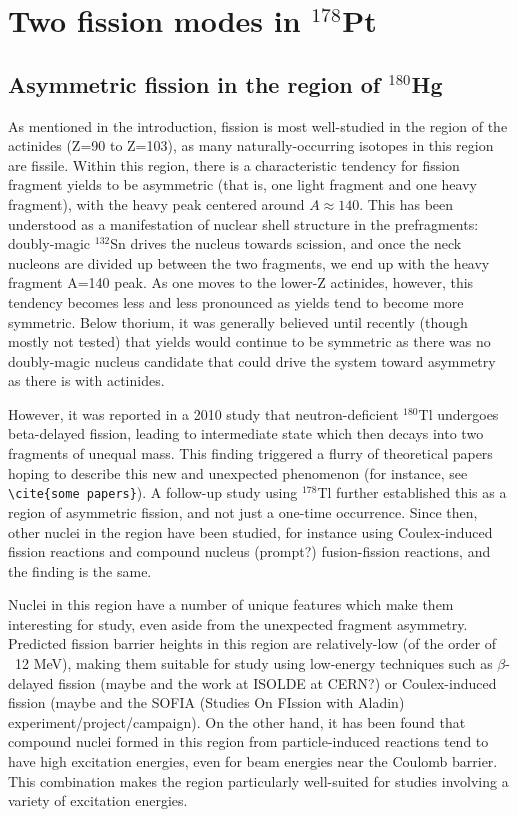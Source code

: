 \chapter{Two fission modes in $^{178}$Pt}\label{chap:178Pt}

\section{Asymmetric fission in the region of $^{180}$Hg}
As mentioned in the introduction, fission is most well-studied in the region of the actinides (Z=90 to Z=103), as many naturally-occurring isotopes in this region are fissile. Within this region, there is a characteristic tendency for fission fragment yields to be asymmetric (that is, one light fragment and one heavy fragment), with the heavy peak centered around $A\approx140$. This has been understood as a manifestation of nuclear shell structure in the prefragments: doubly-magic $^{132}$Sn drives the nucleus towards scission, and once the neck nucleons are divided up between the two fragments, we end up with the heavy fragment A=140 peak. As one moves to the lower-Z actinides, however, this tendency becomes less and less pronounced as yields tend to become more symmetric. Below thorium, it was generally believed until recently (though mostly not tested) that yields would continue to be symmetric as there was no doubly-magic nucleus candidate that could drive the system toward asymmetry as there is with actinides.

However, it was reported in a 2010 study \cite{Andreyev2010} that neutron-deficient $^{180}$Tl undergoes beta-delayed fission, leading to intermediate state {\Hg} which then decays into two fragments of unequal mass. This finding triggered a flurry of theoretical papers hoping to describe this new and unexpected phenomenon (for instance, see \verb|\cite{some papers}|). A follow-up study using $^{178}$Tl \cite{Liberati2013} further established this as a region of asymmetric fission, and not just a one-time occurrence. Since then, other nuclei in the region have been studied, for instance using Coulex-induced fission reactions and compound nucleus (prompt?) fusion-fission reactions, and the finding is the same. 

Nuclei in this region have a number of unique features which make them interesting for study, even aside from the unexpected fragment asymmetry. Predicted fission barrier heights in this region are relatively-low (of the order of ~12 MeV), making them suitable for study using low-energy techniques such as $\beta$-delayed fission (maybe \cite{Andreyev2013} and the work at ISOLDE at CERN?) or Coulex-induced fission (maybe \cite{Martin2015} and the SOFIA (Studies On FIssion with Aladin) experiment/project/campaign). On the other hand, it has been found that compound nuclei formed in this region from particle-induced reactions tend to have high excitation energies, even for beam energies near the Coulomb barrier. This combination makes the region particularly well-suited for studies involving a variety of excitation energies.


